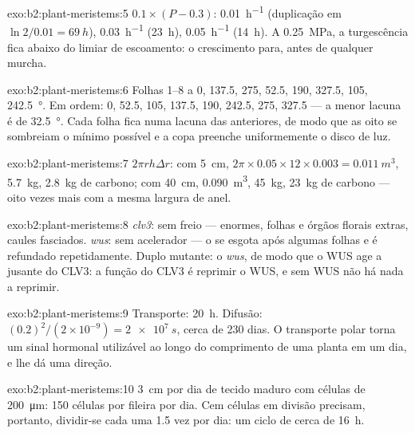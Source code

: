 \begin{solution}{exo:b2:plant-meristems:5}
$0.1\times(P - 0.3)$: \qty{0.01}{h^{-1}} (duplicação em $\ln 2/0.01 =
\qty{69}{h}$), \qty{0.03}{h^{-1}} (\qty{23}{h}),
\qty{0.05}{h^{-1}} (\qty{14}{h}). A \qty{0.25}{MPa}, a turgescência
fica abaixo do limiar de escoamento: o crescimento para, antes de
qualquer murcha.
\end{solution}

\begin{solution}{exo:b2:plant-meristems:6}
Folhas 1--8 a 0, 137.5, 275, 52.5, 190, 327.5, 105, \qty{242.5}{\degree}.
Em ordem: 0, 52.5, 105, 137.5, 190, 242.5, 275, 327.5 --- a menor
lacuna é de \qty{32.5}{\degree}. Cada folha fica numa lacuna das
anteriores, de modo que as oito se sombreiam o mínimo possível e a copa
preenche uniformemente o disco de luz.
\end{solution}

\begin{solution}{exo:b2:plant-meristems:7}
$2\pi r h\Delta r$: com \qty{5}{cm}, $2\pi\times 0.05\times 12\times
0.003 = \qty{0.011}{m^3}$, \qty{5.7}{kg}, \qty{2.8}{kg} de carbono; com
\qty{40}{cm}, \qty{0.090}{m^3}, \qty{45}{kg}, \qty{23}{kg} de carbono
--- oito vezes mais com a mesma largura de anel.
\end{solution}

\begin{solution}{exo:b2:plant-meristems:8}
\emph{clv3}: sem freio ---  enormes, folhas e órgãos florais
extras, caules fasciados. \emph{wus}: sem acelerador --- o  se
esgota após algumas folhas e é refundado repetidamente. Duplo mutante:
o  \emph{wus}, de modo que o WUS age a jusante do CLV3: a função
do CLV3 é reprimir o WUS, e sem WUS não há nada a reprimir.
\end{solution}

\begin{solution}{exo:b2:plant-meristems:9}
Transporte: \qty{20}{h}. Difusão: $(0.2)^{2}/(2\times 10^{-9}) =
\qty{2e7}{s}$, cerca de 230 dias. O transporte polar torna um sinal
hormonal utilizável ao longo do comprimento de uma planta em um dia, e
lhe dá uma direção.
\end{solution}

\begin{solution}{exo:b2:plant-meristems:10}
\qty{3}{cm} por dia de tecido maduro com células de \qty{200}{\micro m}:
\num{150} células por fileira por dia. Cem células em divisão precisam,
portanto, dividir-se cada uma 1.5 vez por dia: um ciclo de cerca de
\qty{16}{h}.
\end{solution}


